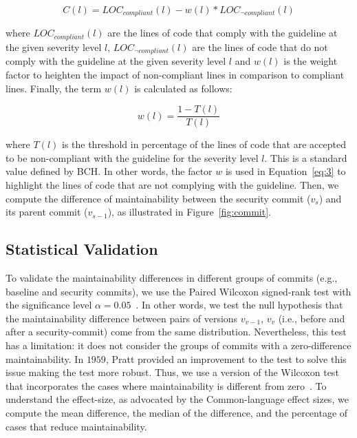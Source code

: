\documentclass[10pt,conference]{IEEEtran}
\begin{document}
\begin{equation}\label{eq:3}
    C(l) = LOC_{compliant}(l) - w(l) * LOC_{\neg compliant}(l)
\end{equation}

\noindent
where $LOC_{compliant}(l)$ are the lines of code that comply with the guideline
at the given severity level $l$, $LOC_{\neg compliant}(l)$ are the lines of code
that do not comply with the guideline at the given severity level $l$ and $w(l)$
is the weight factor to heighten the impact of non-compliant lines in comparison to
compliant lines. Finally, the term $w(l)$ is calculated as follows:

\begin{equation}
    w(l) = \frac{1 - T(l)}{T(l)}
\end{equation}

\noindent
where $T(l)$ is the threshold in percentage of the lines of code that are
accepted to be non-compliant with the guideline for the severity level $l$. This
is a standard value defined by BCH. In other words, the factor $w$ is used in
Equation~\ref{eq:3} to highlight the lines of code that are not complying with
the guideline. Then, we compute the difference of maintainability between the
security commit ($v_{s}$) and its parent commit ($v_{s-1}$), as illustrated in
Figure~\ref{fig:commit}.

\subsection{Statistical Validation}\label{sec:statsval}
%
To validate the maintainability differences in different groups of commits
(e.g., baseline and security commits), we use the Paired Wilcoxon signed-rank
test with the significance level $\alpha = 0.05$~\cite{10.2307/3001968}. In
other words, we test the null hypothesis that the maintainability difference
between pairs of versions $v_{v-1}$, $v_v$ (i.e., before and after a
security-commit) come from the same distribution. Nevertheless, this test has a
limitation: it does not consider the groups of commits with a zero-difference
maintainability. In $1959$, Pratt provided an improvement to the test to solve
this issue making the test more robust. Thus, we use a version of the Wilcoxon
test that incorporates the cases where maintainability is different from zero~\cite{10.2307/2282543}.
To understand the effect-size, as
advocated by the Common-language effect sizes\cite{graw:1992}, we compute the
mean difference, the median of the difference, and the percentage of cases that
reduce maintainability.
%
\end{document}
